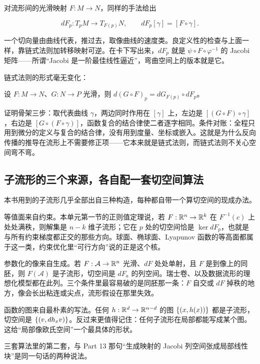 对流形间的光滑映射 \(F:M\to N\)，同样的手法给出

\[
dF_{p}:T_{p}M\to T_{F(p)}N,\qquad
dF_{p}[\gamma]=[F\circ\gamma].
\]

一个切向量由曲线代表，推过去，取像曲线的速度类。良定义性的检查与上面一样，靠链式法则加转移映射可逆。在卡下写出来，\(dF_{p}\) 就是 \(\psi\circ F\circ\varphi^{-1}\) 的 Jacobi 矩阵——所谓``Jacobi 是一阶最佳线性逼近''，弯曲空间上的版本就是它。

链式法则的形式毫无变化：

\begin{proposition}
设 \(F:M\to N\)、\(G:N\to P\) 光滑，则 \(d(G\circ F)_{p}=dG_{F(p)}\circ dF_{p}\)。
\end{proposition}

证明骨架三步：取代表曲线 \(\gamma\)，两边同时作用在 \([\gamma]\) 上，左边是 \([(G\circ F)\circ\gamma]\)，右边是 \([G\circ(F\circ\gamma)]\)，函数复合的结合律使二者逐字相同。条件对账：全程只用到微分的定义与复合的结合律，没有用到度量、坐标或嵌入。这就是为什么反向传播的推导在流形上不需要修正项——它本来就是链式法则，而链式法则不关心空间弯不弯。

\subsection{子流形的三个来源，各自配一套切空间算法}

本书用到的子流形几乎全部出自三种构造，每种都自带一个算切空间的现成办法。

等值面来自约束。本单元第一节的正则值定理说，若 \(F:\mathbb{R}^{n}\to\mathbb{R}^{k}\) 在 \(F^{-1}(c)\) 上处处满秩，则解集是 \(n-k\) 维子流形；它在 \(p\) 处的切空间恰是 \(\ker dF_{p}\)，也就是与所有约束梯度都正交的那些方向。球面、椭球面、Lyapunov 函数的等高面都属于这一类，约束优化里``可行方向''说的正是这个核。

参数化的像来自生成。若 \(F:\mathcal{A}\to\mathbb{R}^{n}\) 光滑、\(dF\) 处处单射，且 \(F\) 是到像上的同胚，则 \(F(\mathcal{A})\) 是子流形，切空间是 \(dF_{a}\) 的列空间。瑞士卷、以及数据流形的理想化模型都在此列。三个条件里最容易破的是同胚那一条：\(F\) 自交或 \(dF\) 掉秩的地方，像会长出粘连或尖点，流形假设在那里失效。

函数的图来自最朴素的写法。任何 \(h:\mathbb{R}^{d}\to\mathbb{R}^{n-d}\) 的图 \(\left\{(x,h(x))\right\}\) 都是子流形，切空间是 \(\left\{(v,dh_{x}v)\right\}\)。反过来更值得记住：任何子流形在局部都能写成某个图。这给``局部像欧氏空间''一个最具体的形状。

三套算法里的第二套，与 Part 13 那句``生成映射的 Jacobi 列空间张成局部线性块''是同一句话的两种说法。

